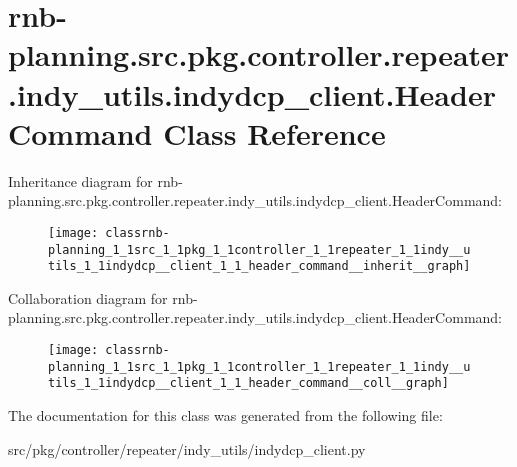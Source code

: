 \hypertarget{classrnb-planning_1_1src_1_1pkg_1_1controller_1_1repeater_1_1indy__utils_1_1indydcp__client_1_1_header_command}{}\section{rnb-\/planning.src.\+pkg.\+controller.\+repeater.\+indy\+\_\+utils.\+indydcp\+\_\+client.\+Header\+Command Class Reference}
\label{classrnb-planning_1_1src_1_1pkg_1_1controller_1_1repeater_1_1indy__utils_1_1indydcp__client_1_1_header_command}


Inheritance diagram for rnb-\/planning.src.\+pkg.\+controller.\+repeater.\+indy\+\_\+utils.\+indydcp\+\_\+client.\+Header\+Command\+:
\nopagebreak
\begin{figure}[H]
\begin{center}
\leavevmode
\texttt{[image: classrnb-planning\_1\_1src\_1\_1pkg\_1\_1controller\_1\_1repeater\_1\_1indy\_\_utils\_1\_1indydcp\_\_client\_1\_1\_header\_command\_\_inherit\_\_graph]}
\end{center}
\end{figure}


Collaboration diagram for rnb-\/planning.src.\+pkg.\+controller.\+repeater.\+indy\+\_\+utils.\+indydcp\+\_\+client.\+Header\+Command\+:
\nopagebreak
\begin{figure}[H]
\begin{center}
\leavevmode
\texttt{[image: classrnb-planning\_1\_1src\_1\_1pkg\_1\_1controller\_1\_1repeater\_1\_1indy\_\_utils\_1\_1indydcp\_\_client\_1\_1\_header\_command\_\_coll\_\_graph]}
\end{center}
\end{figure}


The documentation for this class was generated from the following file\+:\begin{DoxyCompactItemize}
\item 
src/pkg/controller/repeater/indy\+\_\+utils/indydcp\+\_\+client.\+py\end{DoxyCompactItemize}
